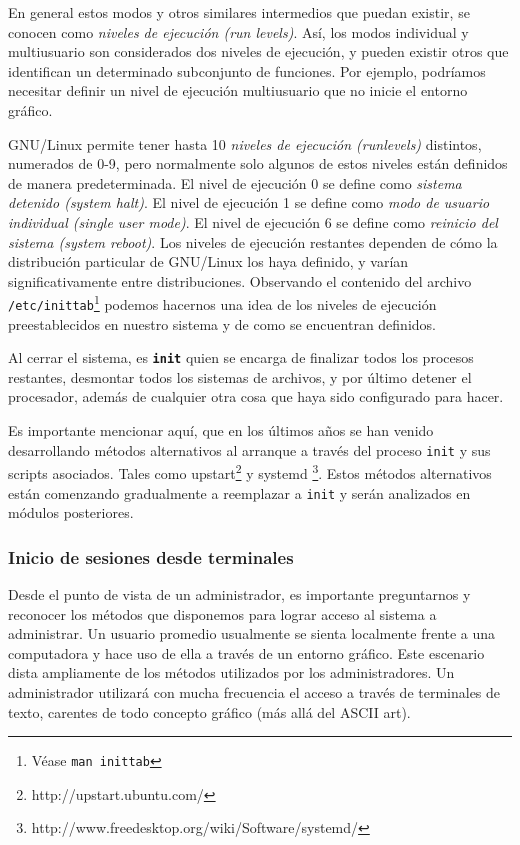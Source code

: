 \documentclass[12pt]{article}
\begin{document}
En general estos modos y otros similares intermedios que puedan existir, 
se conocen como \textit{niveles de ejecución (run levels)}. Así, los 
modos individual y multiusuario son considerados dos niveles de ejecución,
y pueden existir otros que identifican un determinado subconjunto de 
funciones. Por ejemplo, podríamos necesitar definir un nivel de ejecución
multiusuario que no inicie el entorno gráfico. 


 GNU/Linux permite tener hasta 10 \textit{niveles de ejecución 
(runlevels)} distintos, numerados de 0-9, pero normalmente solo algunos 
de estos  niveles están definidos de manera predeterminada. El nivel de 
ejecución 0 se define como \textit{sistema detenido (system halt)}. 
El nivel de  ejecución 1 se define como \textit{modo de usuario individual
 (single user mode)}. El nivel de ejecución 6 se define como 
\textit{reinicio del sistema (system reboot)}. Los niveles de ejecución 
restantes dependen de cómo la distribución particular
de GNU/Linux los haya definido, y varían significativamente entre
distribuciones. Observando el contenido del archivo
\texttt{/etc/inittab}\footnote{Véase \texttt{man inittab}} 
podemos hacernos una idea de los niveles de
ejecución preestablecidos en nuestro sistema y de como se encuentran
definidos.

 Al cerrar el sistema, es \texttt{\textbf{init}} quien se encarga de
finalizar todos los procesos restantes, desmontar todos los sistemas de 
archivos, y por último detener el procesador, además de cualquier otra cosa 
que haya sido configurado para hacer.  

Es importante mencionar aquí, que en los últimos años se han venido 
desarrollando métodos alternativos al arranque a través del
proceso \texttt{init} y sus scripts asociados. Tales como upstart\footnote{
http://upstart.ubuntu.com/} y systemd
\footnote{http://www.freedesktop.org/wiki/Software/systemd/}.
Estos métodos alternativos están comenzando gradualmente a reemplazar  
a \texttt{init} y serán analizados en módulos posteriores. 


\subsubsection{Inicio de sesiones desde terminales}

Desde el punto de vista de un administrador, es importante preguntarnos 
y reconocer los métodos que disponemos para lograr acceso al sistema a
administrar. Un usuario promedio usualmente se sienta localmente frente
a una computadora y hace uso de ella a través de un entorno gráfico. Este
escenario dista ampliamente de los métodos utilizados por los 
administradores. Un administrador utilizará con mucha frecuencia el
acceso a través de terminales de texto, carentes de todo concepto gráfico
(más allá del ASCII art). 
\end{document}
